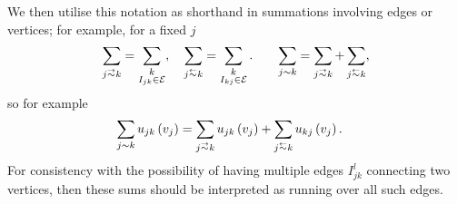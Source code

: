 We then utilise this notation as shorthand in summations involving edges or vertices; for example, for a fixed $j$
\begin{align*}
	\sum_{j\conLeft k} = \sum_{\substack{k \\ I_{jk}\in \edgeSet}}, 
	&\quad 	\sum_{j\conRight k} = \sum_{\substack{k \\ I_{kj}\in \edgeSet}}.
	&\quad \sum_{j\con k} = \sum_{j\conLeft k} + \sum_{j\conRight k},
\end{align*}
so for example
\begin{align*}
	\sum_{j\con k}u_{jk}\bracs{v_j} &= \sum_{j\conLeft k}u_{jk}\bracs{v_j} + \sum_{j\conRight k}u_{kj}\bracs{v_j}.
\end{align*}
For consistency with the possibility of having multiple edges $I_{jk}^l$ connecting two vertices, then these sums should be interpreted as running over all such edges. \newline

